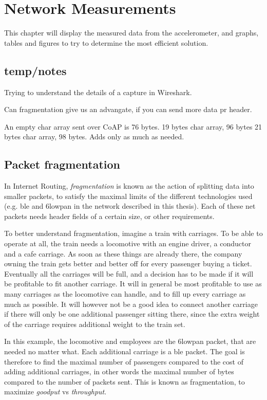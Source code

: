 \chapter{Network Measurements}
\label{chp:measurements2}

This chapter will display the measured data from the accelerometer, and graphs, tables and figures to try to determine the most efficient solution. 

\section{temp/notes}

Trying to understand the details of a capture in Wireshark. 

Can fragmentation give us an advangate, if you can send more data pr header. 

An empty char array sent over CoAP is 76 bytes. 
19 bytes char array, 96 bytes
21 bytes char array, 98 bytes. Adds only as much as needed. 
 



\section{Packet fragmentation}

In Internet Routing, \textit{fragmentation} is known as the action of splitting data into smaller packets, to satisfy the maximal limits of the different technologies used (e.g. \gls{ble} and \gls{6lowpan} in the network described in this thesis). Each of these net packets needs header fields of a certain size, or other requirements.

To better understand fragmentation, imagine a train with carriages. To be able to operate at all, the train needs a locomotive with an engine driver, a conductor and a cafe carriage. As soon as these things are already there, the company owning the train gets better and better off for every passenger buying a ticket. Eventually all the carriages will be full, and a decision has to be made if it will be profitable to fit another carriage. It will in general be most profitable to use as many carriages as the locomotive can handle, and to fill up every carriage as much as possible. It will however not be a good idea to connect another carriage if there will only be one additional passenger sitting there, since the extra weight of the carriage requires additional weight to the train set. 

In this example, the locomotive and employees are the \gls{6lowpan} packet, that are needed no matter what. Each additional carriage is a \gls{ble} packet. The goal is therefore to find the maximal number of passengers compared to the cost of adding additional carriages, in other words the maximal number of bytes compared to the number of packets sent. This is known as \gls{fragmentation}, to maximize \textit{goodput} vs \textit{throughput}. 

